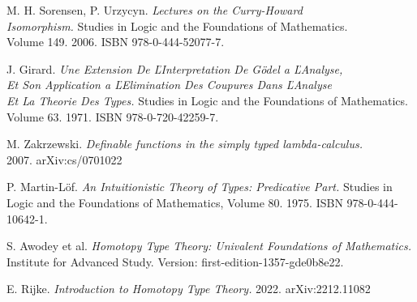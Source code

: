 \documentclass{article}[12pt]
\begin{document}
\begin{thebibliography}{}
    M. H. Sorensen, P. Urzycyn. \textit{Lectures on the Curry-Howard \\ Isomorphism.}
    Studies in Logic and the Foundations of Mathematics. \\ Volume 149. 2006. ISBN
    978-0-444-52077-7.

    J. Girard. \textit{Une Extension De ĽInterpretation De Gödel a ĽAnalyse, \\ Et Son Application  a ĽElimination Des Coupures Dans ĽAnalyse  \\ Et La Theorie Des Types.}
    Studies in Logic and the Foundations of Mathematics. Volume 63. 1971. ISBN 978-0-720-42259-7.

    M. Zakrzewski. \textit{Definable functions in the simply typed lambda-calculus.} \\ 2007.
    arXiv:cs/0701022
    
    P. Martin-Löf. \textit{An Intuitionistic Theory of Types: Predicative Part.} Studies in Logic and the Foundations of Mathematics,
    Volume 80. 1975. ISBN 978-0-444-10642-1.

    S. Awodey et al. \textit{Homotopy Type Theory: Univalent Foundations of Mathematics.} Institute for Advanced Study.
    Version: first-edition-1357-gde0b8e22.

    E. Rijke. \textit{Introduction to Homotopy Type Theory.} 2022. arXiv:2212.11082
\end{thebibliography}
\end{document}
